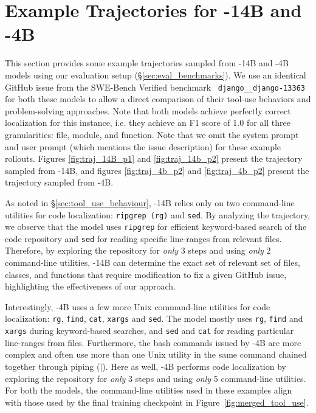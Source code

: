 \section{Example Trajectories for \methodname-14B and \methodname-4B}\label{appendix:traj_examples}
This section provides some example trajectories sampled from \methodname-14B and \methodname-4B models using our evaluation setup (\S\ref{sec:eval_benchmarks}). We use an identical GitHub issue from the SWE-Bench Verified benchmark~\citep{chowdhury2024swebenchverified} \texttt{django\_\_django-13363} for both these models to allow a direct comparison of their tool-use behaviors and problem-solving approaches. Note that both models achieve  perfectly correct localization for this instance, i.e. they achieve an F1 score of 1.0 for all three granularities: file, module, and function. Note that we omit the system prompt and user prompt (which mentions the issue description) for these example rollouts. Figures \ref{fig:traj_14B_p1} and \ref{fig:traj_14b_p2} present the trajectory sampled from \methodname-14B, and figures \ref{fig:traj_4b_p2} and \ref{fig:traj_4b_p2} present the trajectory sampled from \methodname-4B.

As noted in \S\ref{sec:tool_use_behaviour}, \methodname-14B relies only on two command-line utilities for code localization: \texttt{ripgrep (rg)} and \texttt{sed}. By analyzing the trajectory, we observe that the model uses \texttt{ripgrep} for efficient keyword-based search of the code repository and \texttt{sed} for reading specific line-ranges from relevant files. Therefore, by exploring the repository for \emph{only} 3 steps and using \emph{only} 2 command-line utilities, \methodname-14B can determine the exact set of relevant set of files, classes, and functions that require modification to fix a given GitHub issue, highlighting the effectiveness of our approach.

Interestingly, \methodname-4B uses a few more Unix command-line utilities for code localization: \texttt{rg}, \texttt{find}, \texttt{cat}, \texttt{xargs} and \texttt{sed}. The model mostly uses \texttt{rg}, \texttt{find} and \texttt{xargs} during keyword-based searches, and \texttt{sed} and \texttt{cat} for reading particular line-ranges from files. Furthermore, the bash commands issued by \methodname-4B are more complex and often use more than one Unix utility in the same command chained together through piping ($|$). Here as well, \methodname-4B performs code localization by exploring the repository for \emph{only} 3 steps and using \emph{only} 5 command-line utilities. For both the models, the command-line utilities used in these examples align with those used by the final training checkpoint in Figure~\ref{fig:merged_tool_use}.


